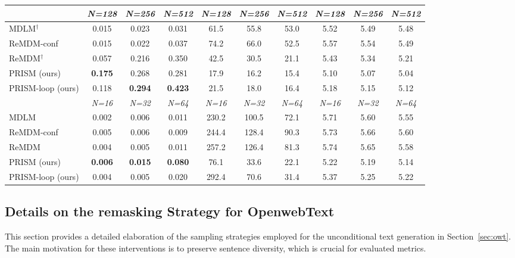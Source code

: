 \begin{table}[h]
{\begin{tabular}{lccccccccc}
\midrule
& \textit{N=128} & \textit{N=256} & \textit{N=512} & \textit{N=128} & \textit{N=256} & \textit{N=512} & \textit{N=128} & \textit{N=256} & \textit{N=512} \\
\midrule
MDLM$^\dagger$ & 0.015 & 0.023 & 0.031 & 61.5 & 55.8 & 53.0 & 5.52 & 5.49 & 5.48 \\
ReMDM-conf & 0.015 & 0.022 & 0.037 & 74.2 & 66.0 & 52.5 & 5.57 & 5.54 & 5.49 \\
ReMDM$^\dagger$ & 0.057 & 0.216 & 0.350 & 42.5 & 30.5 & 21.1 & 5.43 & 5.34 & 5.21 \\
\rowcolor{orange!25}
PRISM (ours) & \textbf{0.175} & 0.268 & 0.281 & 17.9 & 16.2 & 15.4 & 5.10 & 5.07 & 5.04 \\
\rowcolor{orange!25}
PRISM-loop (ours) & 0.118 & \textbf{0.294} & \textbf{0.423} & 21.5 & 18.0 & 16.4 & 5.18 & 5.15 & 5.12 \\
\midrule
& \textit{N=16} & \textit{N=32} & \textit{N=64} & \textit{N=16} & \textit{N=32} & \textit{N=64} & \textit{N=16} & \textit{N=32} & \textit{N=64} \\
\midrule
MDLM & 0.002 & 0.006 & 0.011 & 230.2 & 100.5 & 72.1 & 5.71 & 5.60 & 5.55 \\
ReMDM-conf & 0.005 & 0.006 & 0.009 & 244.4 & 128.4 & 90.3 & 5.73 & 5.66 & 5.60 \\
ReMDM & 0.004 & 0.005 & 0.011 & 257.2 & 126.4 & 81.3 & 5.74 & 5.65 & 5.58 \\
\rowcolor{orange!25}
PRISM (ours) & \textbf{0.006} & \textbf{0.015} & \textbf{0.080} & 76.1 & 33.6 & 22.1 & 5.22 & 5.19 & 5.14\\
\rowcolor{orange!25}
PRISM-loop (ours) & 0.004 & 0.005 & 0.020 & 292.4 & 70.6 & 31.4 & 5.37 & 5.25 & 5.22 \\
\bottomrule
\end{tabular}
}
\vspace{-1.5ex}
\end{table}

\subsection{Details on the remasking Strategy for OpenwebText}
\label{Appendix: owt inference ablations}
This section provides a detailed elaboration of the sampling strategies employed for the unconditional text generation in Section~\ref{sec:owt}. The main motivation for these interventions is to preserve sentence diversity, which is crucial for evaluated metrics.

